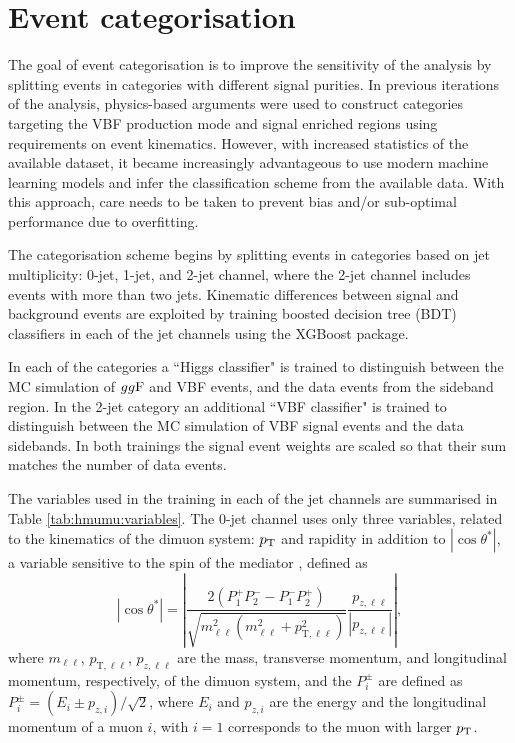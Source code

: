 \section{Event categorisation}

The goal of event categorisation is to improve the sensitivity of the
analysis by splitting events in categories with different signal
purities. In previous iterations of the analysis, physics-based
arguments were used to construct categories targeting the VBF 
production mode and signal enriched regions using requirements on
event kinematics. However, with increased statistics of the
available dataset, it became increasingly advantageous to use
modern machine learning models and infer the classification scheme
from the available data. With this approach, care needs to be taken
to prevent bias and/or sub-optimal performance due to overfitting.

The categorisation scheme begins by splitting events in categories
based on jet multiplicity: 0-jet, 1-jet, and 2-jet channel, where
the 2-jet channel includes events with more than two jets.
Kinematic differences between signal and background events are
exploited by training boosted decision tree (BDT) classifiers in
each of the jet channels using the XGBoost \cite{Chen:2016:XST:2939672.2939785}
package.

In each of the categories a ``Higgs classifier" is trained to
distinguish between the MC simulation of $gg\text{F}$ and VBF events, and the
data events from the sideband region. In the 2-jet
category an additional ``VBF classifier" is trained to distinguish
between the MC simulation of VBF signal events and the data sidebands.
In both trainings the signal event weights are scaled so that their sum
matches the number of data events. 

The variables used in the training in each of the jet channels are
summarised in Table \ref{tab:hmumu:variables}. The 0-jet channel uses
only three variables, related to the kinematics of the dimuon system:
$p_{\text{T}}$ and rapidity in addition to $|\cos{\theta^*}|$, a variable
sensitive to the spin of the mediator \cite{PhysRevD.16.2219,
Sirunyan:2018swq}, defined as
\begin{equation}
\label{eq:hmumu:costhetastar}
|\cos{\theta^*}| =
\left |
\frac{2(P_1^+P_2^- - P_1^-P_2^+)}{\sqrt{m^2_{\ell\ell}(m^2_{\ell\ell} + p^2_{\text{T},\ell\ell})}}
\frac{p_{z, \ell\ell}}{|p_{z, \ell\ell}|}
\right |,
\end{equation}
where $m_{\ell\ell}$, $p_{\text{T},\ell\ell}$, $p_{z,\ell\ell}$ are
the mass, transverse momentum, and longitudinal momentum, respectively, of the 
dimuon system, and the $P^{\pm}_i$ are defined as
$P^{\pm}_i = (E_i \pm p_{z,i}) / \sqrt{2}$, where $E_i$ and $p_{z,i}$
are the energy and the longitudinal momentum of a muon $i$, with $i=1$
corresponds to the muon with larger $p_{\text{T}}$.

